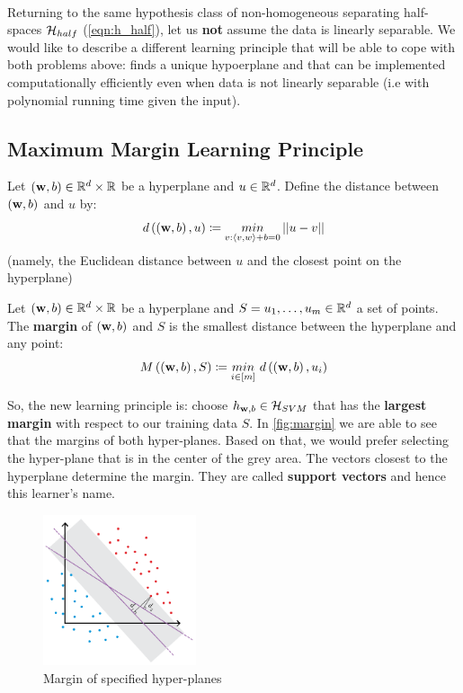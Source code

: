 ~\\Returning to the same hypothesis class of non-homogeneous separating half-spaces $\mathcal{H}_{half}$ (\ref{eqn:h_half}), let us \textbf{not} assume the data is linearly separable. We would like to describe a different learning principle that will be able to cope with both problems above: finds a unique hypoerplane and that can be implemented computationally efficiently even when data is not linearly separable (i.e with polynomial running time given the input).

\subsection{Maximum Margin Learning Principle}

\begin{definition}
Let $\left(\mathbf{w},b\right)\in \mathbb{R}^d\times\mathbb{R}$ be a hyperplane and $u\in\mathbb{R}^d$. Define the distance between $\left(\mathbf{w},b\right)$ and $u$ by: $$ d\left(\left(\mathbf{w},b\right),u\right)\coloneqq \underset{v:\left\langle v,w\right\rangle+b=0}{min}\left|\left|u-v\right|\right| $$ (namely, the Euclidean distance between $u$ and the closest point on the hyperplane)
\end{definition}

\begin{definition}[Margin]\label{def:margin}
Let $\left(\mathbf{w},b\right)\in \mathbb{R}^d\times\mathbb{R}$ be a hyperplane and $S=u_1,\ldots,u_m\in\mathbb{R}^d$ a set of points. The \textbf{margin} of $\left(\mathbf{w},b\right)$ and $S$ is the smallest distance between the hyperplane and any point: $$ M\left(\left(\mathbf{w},b\right),S\right) \coloneqq \underset{i\in\left[m\right]}{min}\,\, d\left(\left(\mathbf{w},b\right),u_i\right) $$
\end{definition}

So, the new learning principle is: choose $h_{\mathbf{w},b}\in\mathcal{H}_{SVM}$ that has the \textbf{largest margin} with respect to our training data $S$. In \autoref{fig:margin} we are able to see that the margins of both hyper-planes. Based on that, we would prefer selecting the hyper-plane that is in the center of the grey area. The vectors closest to the hyperplane determine the margin. They are called \textbf{support vectors} and hence this learner's name.

\begin{figure}[h!]
	\centering
	\includegraphics[width=0.4\textwidth]{chapters/classification/figures/3_5.png}
	\caption{Margin of specified hyper-planes}
	\label{fig:margin}
\end{figure}



